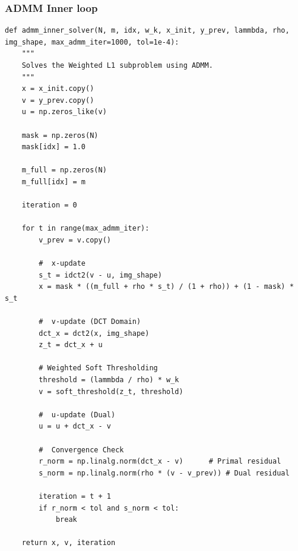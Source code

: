\documentclass[12pt,a4paper,onecolumn]{exam}
\begin{document}
\subsubsection{ADMM  Inner loop}
\begin{lstlisting}
def admm_inner_solver(N, m, idx, w_k, x_init, y_prev, lammbda, rho, img_shape, max_admm_iter=1000, tol=1e-4):
    """
    Solves the Weighted L1 subproblem using ADMM.
    """
    x = x_init.copy()
    v = y_prev.copy()
    u = np.zeros_like(v)     
    
    mask = np.zeros(N)
    mask[idx] = 1.0       
    
    m_full = np.zeros(N)
    m_full[idx] = m       

    iteration = 0
    
    for t in range(max_admm_iter):
        v_prev = v.copy()
        
        #  x-update 
        s_t = idct2(v - u, img_shape)
        x = mask * ((m_full + rho * s_t) / (1 + rho)) + (1 - mask) * s_t
        
        #  v-update (DCT Domain)
        dct_x = dct2(x, img_shape)
        z_t = dct_x + u
        
        # Weighted Soft Thresholding
        threshold = (lammbda / rho) * w_k
        v = soft_threshold(z_t, threshold)
        
        #  u-update (Dual) 
        u = u + dct_x - v
        
        #  Convergence Check 
        r_norm = np.linalg.norm(dct_x - v)      # Primal residual
        s_norm = np.linalg.norm(rho * (v - v_prev)) # Dual residual
        
        iteration = t + 1
        if r_norm < tol and s_norm < tol:
            break
            
    return x, v, iteration   
\end{lstlisting}
\end{document}
